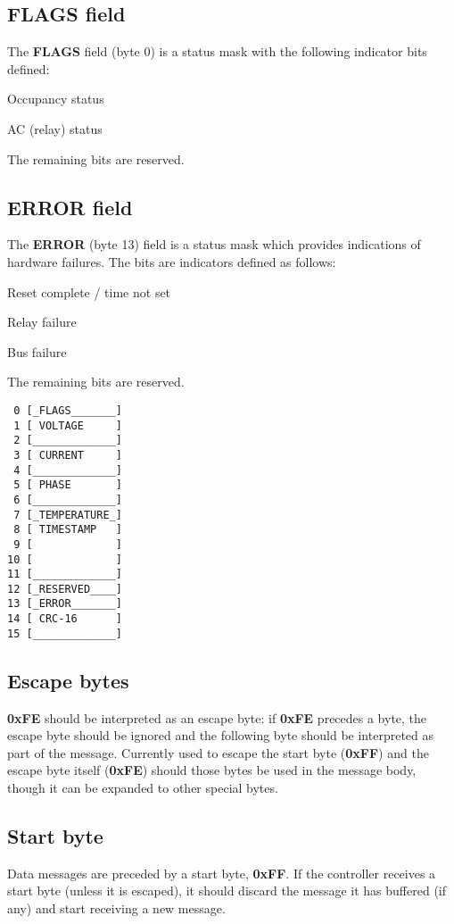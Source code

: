 \documentclass[11pt]{article}
\begin{document}
\vspace{12pt}
\noindent
\begin{minipage}{.5\textwidth}
\subsection{FLAGS field}
The \textbf{FLAGS} field (byte 0) is a status mask with the following indicator bits defined:
\begin{description}
	\itemsep 0pt
	\item[0x01] Occupancy status
	\item[0x02] AC (relay) status 
\end{description}
The remaining bits are reserved.

\subsection{ERROR field}
\label{subsec:errorfield}
The \textbf{ERROR} (byte 13) field is a status mask which provides indications of hardware failures. The bits are indicators defined as follows:
\begin{description}
	\itemsep 0pt
	\item[0x80] Reset complete / time not set
	\item[0x40] Relay failure
	\item[0x20] Bus failure
\end{description}
The remaining bits are reserved. 
\end{minipage}
\hspace{24pt}
\begin{minipage}{.25\textwidth}
\vspace{12pt}
\begin{verbatim}
 0 [_FLAGS_______]
 1 [ VOLTAGE     ]
 2 [_____________]
 3 [ CURRENT     ]
 4 [_____________]
 5 [ PHASE       ]
 6 [_____________]
 7 [_TEMPERATURE_]
 8 [ TIMESTAMP   ]
 9 [             ]
10 [             ]
11 [_____________]
12 [_RESERVED____]
13 [_ERROR_______]
14 [ CRC-16      ]
15 [_____________]
\end{verbatim}
\end{minipage}

\subsection{Escape bytes}
\textbf{0xFE} should be interpreted as an escape byte: if \textbf{0xFE} precedes a byte, the escape byte should be ignored and the following byte should be interpreted as part of the message. Currently used to escape the start byte (\textbf{0xFF}) and the escape byte itself (\textbf{0xFE}) should those bytes be used in the message body, though it can be expanded to other special bytes.

\subsection{Start byte}
Data messages are preceded by a start byte, \textbf{0xFF}. If the controller receives a start byte (unless it is escaped), it should discard the message it has buffered (if any) and start receiving a new message.
\end{document}

